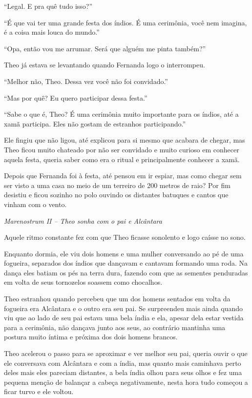``Legal. E pra quê tudo isso?''

``É que vai ter uma grande festa dos índios. É uma cerimônia, você nem
imagina, é a coisa mais louca do mundo.''

``Opa, então vou me arrumar. Será que alguém me pinta também?''

Theo já estava se levantando quando Fernanda logo o interrompeu.

``Melhor não, Theo. Dessa vez você não foi convidado.''

``Mas por quê? Eu quero participar dessa festa.''

``Sabe o que é, Theo? É uma cerimônia muito importante para os índios,
até a xamã participa. Eles não gostam de estranhos participando.''

Ele fingiu que não ligou, até explicou para si mesmo que acabara de
chegar, mas Theo ficou muito chateado por não ser convidado e muito
curioso em conhecer aquela festa, queria saber como era o ritual e
principalmente conhecer a xamã.

Depois que Fernanda foi à festa, até pensou em ir espiar, mas como
chegar sem ser visto a uma casa no meio de um terreiro de 200 metros de
raio? Por fim desistiu e ficou sozinho no polo ouvindo os distantes
batuques e cantos que vinham com o vento.

\asterisc

\emph{Marenostrum II -- Theo sonha com o pai e Alcântara}

Aquele ritmo constante fez com que Theo ficasse sonolento e logo caísse
no sono.

Enquanto dormia, ele viu dois homens e uma mulher conversando ao pé de
uma fogueira, separados dos índios que dançavam e cantavam formando uma
roda. Na dança eles batiam os pés na terra dura, fazendo com que as
sementes penduradas em volta de seus tornozelos soassem como chocalhos.

Theo estranhou quando percebeu que um dos homens sentados em volta da
fogueira era Alcântara e o outro era seu pai. Se surpreendeu mais ainda
quando viu que ao lado de seu pai estava uma bela índia e ela, apesar
dela estar vestida para a cerimônia, não dançava junto aos seus, ao
contrário mantinha uma postura muito íntima e próxima dos dois homens
brancos.

Theo acelerou o passo para se aproximar e ver melhor seu pai, queria
ouvir o que ele conversava com Alcântara e com a índia, mas quanto mais
caminhava perto deles mais eles pareciam distantes, a bela índia olhou
para seus olhos e fez uma pequena menção de balançar a cabeça
negativamente, nesta hora tudo começou a ficar turvo e ele voltou.


